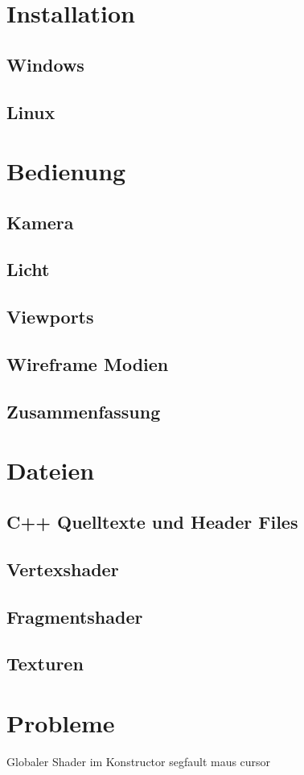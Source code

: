 \documentclass{article}
\begin{document}
\section{Installation}
\subsection{Windows}
\subsection{Linux}
\section{Bedienung}
\subsection{Kamera}
\subsection{Licht}
\subsection{Viewports}
\subsection{Wireframe Modien}
\subsection{Zusammenfassung}
\section{Dateien}
\subsection{C++ Quelltexte und Header Files}
\subsection{Vertexshader}
\subsection{Fragmentshader}
\subsection{Texturen}
\section{Probleme}
Globaler Shader im Konstructor segfault 
maus cursor
\end{document}
